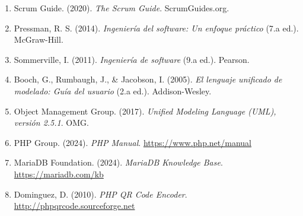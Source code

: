 \documentclass[12pt, letterpaper, oneside]{report}
\begin{document}
\begin{enumerate}
\item Scrum Guide. (2020). \textit{The Scrum Guide}. ScrumGuides.org.
\item Pressman, R. S. (2014). \textit{Ingenier\'ia del software: Un enfoque pr\'actico} (7.a ed.). McGraw-Hill.
\item Sommerville, I. (2011). \textit{Ingenier\'ia de software} (9.a ed.). Pearson.
\item Booch, G., Rumbaugh, J., \& Jacobson, I. (2005). \textit{El lenguaje unificado de modelado: Gu\'ia del usuario} (2.a ed.). Addison-Wesley.
\item Object Management Group. (2017). \textit{Unified Modeling Language (UML), versi\'on 2.5.1}. OMG.
\item PHP Group. (2024). \textit{PHP Manual}. \url{https://www.php.net/manual}
\item MariaDB Foundation. (2024). \textit{MariaDB Knowledge Base}. \url{https://mariadb.com/kb}
\item Dominguez, D. (2010). \textit{PHP QR Code Encoder}. \url{http://phpqrcode.sourceforge.net}
\end{enumerate}
\end{document}
